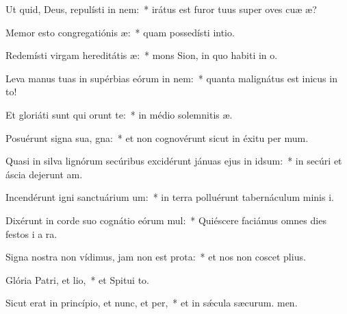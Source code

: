 \item Ut quid, Deus, repulísti in nem:~* irátus est furor tuus super oves cuæ æ?
\item Memor esto congregatiónis æ:~* quam possedísti  intio.
\item Redemísti virgam hereditátis æ:~* mons Sion, in quo habiti in o.
\item Leva manus tuas in supérbias eórum in nem:~* quanta malignátus est inicus in to!
\item Et gloriáti sunt qui orunt te:~* in médio solemnitis æ.
\item Posuérunt signa sua, gna:~* et non cognovérunt sicut in éxitu per mum.
\item Quasi in silva lignórum secúribus excidérunt jánuas ejus in idsum:~* in secúri et áscia dejerunt am.
\item Incendérunt igni sanctuárium um:~* in terra polluérunt tabernáculum minis i.
\item Dixérunt in corde suo cognátio eórum mul:~* Quiéscere faciámus omnes dies festos i a ra.
\item Signa nostra non vídimus, jam non est prota:~* et nos non coscet plius.
\item Glória Patri, et lio,~* et Spitui to.
\item Sicut erat in princípio, et nunc, et per,~* et in sǽcula sæcurum. men.

